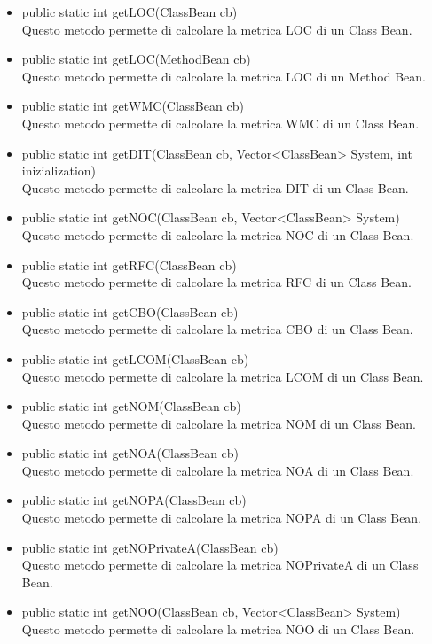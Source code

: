 \documentclass[11pt]{article}
\begin{document}
		\begin{itemize}
			\item public static int getLOC(ClassBean cb)\\
			Questo metodo permette di calcolare la metrica LOC di un Class Bean.
			\item public static int getLOC(MethodBean cb)\\
			Questo metodo permette di calcolare la metrica LOC di un Method Bean.
			\item public static int getWMC(ClassBean cb)\\
			Questo metodo permette di calcolare la metrica WMC di un Class Bean.
			\item public static int getDIT(ClassBean cb, Vector<ClassBean> System, int inizialization)\\
			Questo metodo permette di calcolare la metrica DIT di un Class Bean.
			\item public static int getNOC(ClassBean cb, Vector<ClassBean> System)\\
			Questo metodo permette di calcolare la metrica NOC di un Class Bean.
			\item public static int getRFC(ClassBean cb)\\
			Questo metodo permette di calcolare la metrica RFC di un Class Bean.
			\item public static int getCBO(ClassBean cb)\\
			Questo metodo permette di calcolare la metrica CBO di un Class Bean.
			\item public static int getLCOM(ClassBean cb)\\
			Questo metodo permette di calcolare la metrica LCOM di un Class Bean.
			\item public static int getNOM(ClassBean cb)\\
			Questo metodo permette di calcolare la metrica NOM di un Class Bean.
			\item public static int getNOA(ClassBean cb)\\
			Questo metodo permette di calcolare la metrica NOA di un Class Bean.
			\item public static int getNOPA(ClassBean cb)\\
			Questo metodo permette di calcolare la metrica NOPA di un Class Bean.
			\item public static int getNOPrivateA(ClassBean cb)\\
			Questo metodo permette di calcolare la metrica NOPrivateA di un Class Bean.
			\item public static int getNOO(ClassBean cb, Vector<ClassBean> System)\\
			Questo metodo permette di calcolare la metrica NOO di un Class Bean.
		
		\end{itemize}
		
\end{document}
